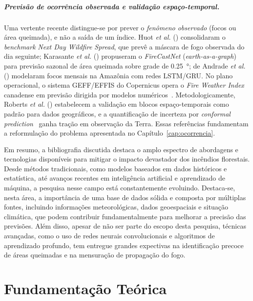 \documentclass[tcc2]{uftex}
\begin{document}
\paragraph{Previsão de \emph{ocorrência observada} e validação espaço-temporal.} Uma vertente recente distingue-se por prever o \emph{fenômeno observado} (focos ou área queimada), e não a saída de um índice. Huot \emph{et al.} (\citeyear{huot2022nextday}) consolidaram o \emph{benchmark} \emph{Next Day Wildfire Spread}, que prevê a máscara de fogo observada do dia seguinte; Karasante \emph{et al.} (\citeyear{karasante2025firecastnet}) propuseram o \emph{FireCastNet} (\emph{earth-as-a-graph}) para previsão sazonal de área queimada sobre grade de \SI{0,25}{\degree}; de Andrade \emph{et al.} (\citeyear{deandrade2024lstmgru}) modelaram focos mensais na Amazônia com redes LSTM/GRU. No plano operacional, o sistema GEFF/EFFIS do Copernicus opera o \emph{Fire Weather Index} canadense em previsão dirigida por modelos numéricos~\cite{digiuseppe2024geff}. Metodologicamente, Roberts \emph{et al.} (\citeyear{roberts2017cv}) estabelecem a validação em blocos espaço-temporais como padrão para dados geográficos, e a quantificação de incerteza por \emph{conformal prediction}~\cite{mortier2024conformal,sadinle2019lac} ganha tração em observação da Terra. Essas referências fundamentam a reformulação do problema apresentada no Capítulo~\ref{cap:ocorrencia}.

Em resumo, a bibliografia discutida destaca o amplo espectro de abordagens e tecnologias disponíveis para mitigar o impacto devastador dos incêndios florestais. Desde métodos tradicionais, como modelos baseados em dados históricos e estatística, até avanços recentes em inteligência artificial e aprendizado de máquina, a pesquisa nesse campo está constantemente evoluindo. Destaca-se, nesta área, a importância de uma base de dados sólida e composta por múltiplas fontes, incluindo informações meteorológicas, dados geoespaciais e situação climática, que podem contribuir fundamentalmente para melhorar a precisão das previsões. Além disso, apesar de não ser parte do escopo desta pesquisa, técnicas avançadas, como o uso de redes neurais convolucionais e algoritmos de aprendizado profundo, tem entregue grandes expectivas na identificação precoce de áreas queimadas e na mensuração de propagação do fogo.

\chapter{Fundamentação Teórica}
\end{document}
